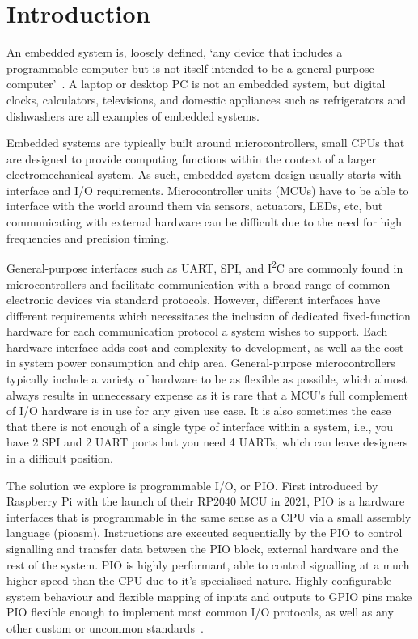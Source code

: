 \chapter{Introduction}
\label{ch:introduction}

An embedded system is, loosely defined, `any device that includes a programmable computer but is not itself intended to be a general-purpose
computer'~\cite{wolf}. A laptop or desktop PC is not an embedded system, but digital clocks, calculators, televisions, and domestic appliances such as refrigerators and dishwashers are all examples of embedded systems.

Embedded systems are typically built around microcontrollers, small CPUs that are designed to provide computing functions within the context of a larger electromechanical system. As such, embedded system design usually starts with interface and I/O requirements. Microcontroller units (MCUs) have to be able to interface with the world around them via sensors, actuators, LEDs, etc, but communicating with external hardware can be difficult due to the need for high frequencies and precision timing.

General-purpose interfaces such as UART, SPI, and I\textsuperscript{2}C are commonly found in microcontrollers and facilitate communication with a broad range of common electronic devices via standard protocols. However, different interfaces have different requirements which necessitates the inclusion of dedicated fixed-function hardware for each communication protocol a system wishes to support. Each hardware interface adds cost and complexity to development, as well as the cost in system power consumption and chip area. General-purpose microcontrollers typically include a variety of hardware to be as flexible as possible, which almost always results in unnecessary expense as it is rare that a MCU's full complement of I/O hardware is in use for any given use case. It is also sometimes the case that there is not enough of a single type of interface within a system, i.e., you have 2 SPI and 2 UART ports but you need 4 UARTs, which can leave designers in a difficult position.

The solution we explore is programmable I/O, or PIO. First introduced by Raspberry Pi with the launch of their RP2040 MCU in 2021, PIO is a hardware interfaces that is programmable in the same sense as a CPU via a small assembly language (pioasm). Instructions are executed sequentially by the PIO to control signalling and transfer data between the PIO block, external hardware and the rest of the system. PIO is highly performant, able to control signalling at a much higher speed than the CPU due to it's specialised nature. Highly configurable system behaviour and flexible mapping of inputs and outputs to GPIO pins make PIO flexible enough to implement most common I/O protocols, as well as any other custom or uncommon standards~\cite{rp2040}.

